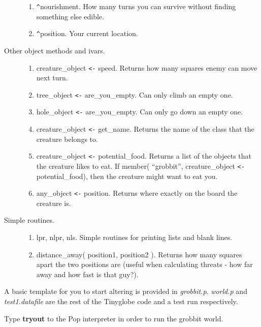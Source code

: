 \begin{description}
\begin{enumerate}
\item \verb+^+nourishment. How many turns you can survive without finding
something else edible. 

\item \verb+^+position. Your current location.

\end{enumerate}

\item  [Other object methods and ivars.]

\begin{enumerate}

\item  creature\_object \verb+<-+ speed. Returns how many squares enemy can move
next turn. 

\item tree\_object \verb+<-+ are\_you\_empty. Can only climb an empty one.

\item hole\_object \verb+<-+ are\_you\_empty. Can only go down an empty one.

\item creature\_object \verb+<-+ get\_name. Returns the name of the class that the
creature belongs to. 

\item creature\_object \verb+<-+ potential\_food. Returns a list of the objects that
the creature likes to eat. If member( ``grobbit'', creature\_object \verb+<-+
potential\_food), then the creature might want to eat you.

\item any\_object \verb+<-+ position. Returns where exactly on the board the
creature is. 

\end{enumerate}

\item [Simple routines.]

\begin{enumerate}

\item lpr, nlpr, nls. Simple routines for printing lists and blank lines. 

\item distance\_away( position1, position2 ). Returns how many
squares apart the two positions are (useful when calculating threats - how
far away and how fast is that guy?).

\end{enumerate}

\end{description}


A basic template for you to start altering is provided in {\em grobbit.p}.
{\em world.p} and {\em test1.datafile} are the rest of the Tinyglobe
code and a test run respectively.

Type {\bf tryout} to the Pop interpreter in order to run the grobbit world.


